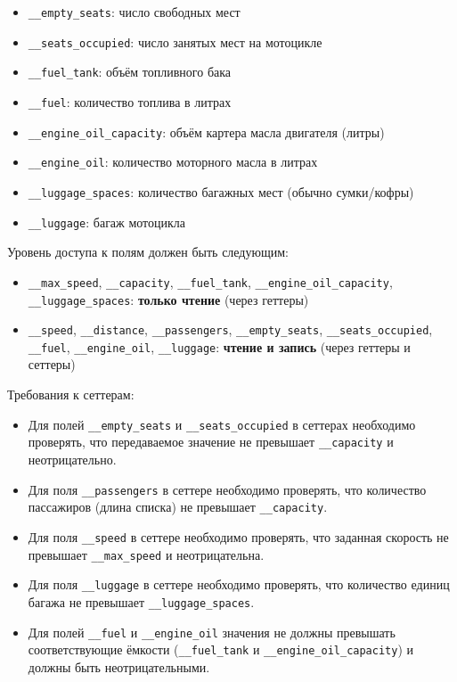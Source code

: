 \begin{enumerate}
\begin{itemize}
    \item \texttt{\_\_empty\_seats}: число свободных мест  
    \item \texttt{\_\_seats\_occupied}: число занятых мест на мотоцикле  
    \item \texttt{\_\_fuel\_tank}: объём топливного бака  
    \item \texttt{\_\_fuel}: количество топлива в литрах  
    \item \texttt{\_\_engine\_oil\_capacity}: объём картера масла двигателя (литры)  
    \item \texttt{\_\_engine\_oil}: количество моторного масла в литрах  
    \item \texttt{\_\_luggage\_spaces}: количество багажных мест (обычно сумки/кофры)  
    \item \texttt{\_\_luggage}: багаж мотоцикла  
\end{itemize}
Уровень доступа к полям должен быть следующим:
\begin{itemize}
    \item \texttt{\_\_max\_speed}, \texttt{\_\_capacity}, \texttt{\_\_fuel\_tank}, \texttt{\_\_engine\_oil\_capacity}, \texttt{\_\_luggage\_spaces}: \textbf{только чтение} (через геттеры)  
    \item \texttt{\_\_speed}, \texttt{\_\_distance}, \texttt{\_\_passengers}, \texttt{\_\_empty\_seats}, \texttt{\_\_seats\_occupied}, \texttt{\_\_fuel}, \texttt{\_\_engine\_oil}, \texttt{\_\_luggage}: \textbf{чтение и запись} (через геттеры и сеттеры)
\end{itemize}
Требования к сеттерам:
\begin{itemize}
    \item Для полей \texttt{\_\_empty\_seats} и \texttt{\_\_seats\_occupied} в сеттерах необходимо проверять, что передаваемое значение не превышает \texttt{\_\_capacity} и неотрицательно.  
    \item Для поля \texttt{\_\_passengers} в сеттере необходимо проверять, что количество пассажиров (длина списка) не превышает \texttt{\_\_capacity}.  
    \item Для поля \texttt{\_\_speed} в сеттере необходимо проверять, что заданная скорость не превышает \texttt{\_\_max\_speed} и неотрицательна.  
    \item Для поля \texttt{\_\_luggage} в сеттере необходимо проверять, что количество единиц багажа не превышает \texttt{\_\_luggage\_spaces}.
    \item Для полей \texttt{\_\_fuel} и \texttt{\_\_engine\_oil} значения не должны превышать соответствующие ёмкости (\texttt{\_\_fuel\_tank} и \texttt{\_\_engine\_oil\_capacity}) и должны быть неотрицательными.

\end{itemize}
\end{enumerate}
